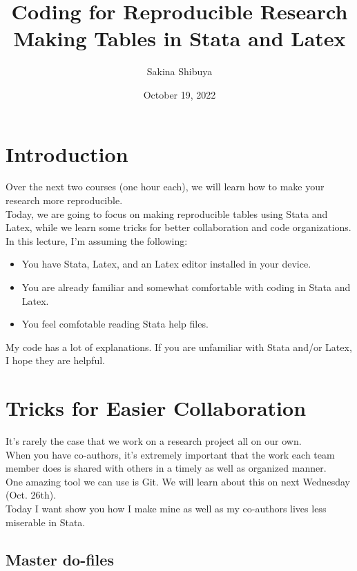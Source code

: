 \documentclass[14pt]{article}
\title{Coding for Reproducible Research \\ Making Tables in Stata and Latex}
\author{Sakina Shibuya}
\date{October 19, 2022}
\begin{document}
		
\maketitle
		
		
\section{Introduction}

Over the next two courses (one hour each), we will learn how to make your research more reproducible. \\

Today, we are going to focus on making reproducible tables using Stata and Latex, while we learn some tricks for better collaboration and code organizations. \\

In this lecture, I'm assuming the following:
\begin{itemize}
	\item You have Stata, Latex, and an Latex editor installed in your device.
	\item You are already familiar and somewhat comfortable with coding in Stata and Latex.
	\item You feel comfotable reading Stata help files.
\end{itemize}

My code has a lot of explanations. If you are unfamiliar with Stata and/or Latex, I hope they are helpful.

\section{Tricks for Easier Collaboration}

It's rarely the case that we work on a research project all on our own. \\ 

When you have co-authors, it's extremely important that the work each team member does is shared with others in a timely as well as organized manner. \\ 

One amazing tool we can use is Git. We will learn about this on next Wednesday (Oct. 26th). \\

Today I want show you how I make mine as well as my co-authors lives less miserable in Stata. \\

\subsection{Master do-files}
\end{document}
